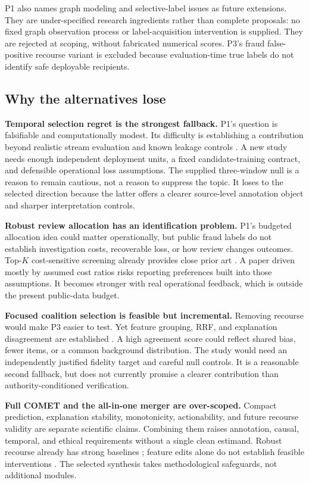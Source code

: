 \documentclass[11pt,a4paper]{article}
\newcommand{\pbreak}{\clearpage}
\newcommand{\lead}[1]{\textbf{\color{navy}#1}}
\begin{document}
P1 also names graph modeling and selective-label issues as future extensions. They are under-specified research ingredients rather than complete proposals: no fixed graph observation process or label-acquisition intervention is supplied. They are rejected at scoping, without fabricated numerical scores. P3's fraud false-positive recourse variant is excluded because evaluation-time true labels do not identify safe deployable recipients.

\pbreak
\subsection{Why the alternatives lose}
\lead{Temporal selection regret is the strongest fallback.} P1's question is falsifiable and computationally modest. Its difficulty is establishing a contribution beyond realistic stream evaluation and known leakage controls \cite{dal2018,bergmeir}. A new study needs enough independent deployment units, a fixed candidate-training contract, and defensible operational loss assumptions. The supplied three-window null is a reason to remain cautious, not a reason to suppress the topic. It loses to the selected direction because the latter offers a clearer source-level annotation object and sharper interpretation controls.

\lead{Robust review allocation has an identification problem.} P1's budgeted allocation idea could matter operationally, but public fraud labels do not establish investigation costs, recoverable loss, or how review changes outcomes. Top-$K$ cost-sensitive screening already provides close prior art \cite{topk}. A paper driven mostly by assumed cost ratios risks reporting preferences built into those assumptions. It becomes stronger with real operational feedback, which is outside the present public-data budget.

\lead{Focused coalition selection is feasible but incremental.} Removing recourse would make P3 easier to test. Yet feature grouping, RRF, and explanation disagreement are established \cite{groupshapley,rrf,biomark,stow}. A high agreement score could reflect shared bias, fewer items, or a common background distribution. The study would need an independently justified fidelity target and careful null controls. It is a reasonable second fallback, but does not currently promise a clearer contribution than authority-conditioned verification.

\lead{Full COMET and the all-in-one merger are over-scoped.} Compact prediction, explanation stability, monotonicity, actionability, and future recourse validity are separate scientific claims. Combining them raises annotation, causal, temporal, and ethical requirements without a single clean estimand. Robust recourse already has strong baselines \cite{dutta,pawelczyk}; feature edits alone do not establish feasible interventions \cite{karimi}. The selected synthesis takes methodological safeguards, not additional modules.
\end{document}
